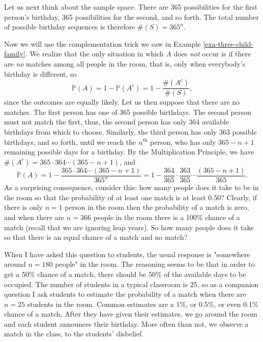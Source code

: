Let us next think about the sample space. There are 365 possibilities
for the first person's birthday, 365 possibilities for the second, and
so forth. The total number of possible birthday sequences is therefore
\(\#(S)=365^{n}\).

Now we will use the complementation trick we saw in Example \ref{exa-three-child-family}. We realize that the only situation in which \(A\) does
\emph{not} occur is if there are \emph{no} matches among all people in the room,
that is, only when everybody's birthday is different, so \[
\mathbb{P}(A)=1-\mathbb{P}(A^{c})=1-\frac{\#(A^{c})}{\#(S)}, \] since
the outcomes are equally likely. Let us then suppose that there are no
matches. The first person has one of 365 possible birthdays. The
second person must not match the first, thus, the second person has
only 364 available birthdays from which to choose. Similarly, the
third person has only 363 possible birthdays, and so forth, until we
reach the \(n^{\mathrm{th}}\) person, who has only \(365-n+1\)
remaining possible days for a birthday. By the Multiplication
Principle, we have \(\#(A^{c})=365\cdot364\cdots(365-n+1)\), and
\begin{equation}
\mathbb{P}(A)=1-\frac{365\cdot364\cdots(365-n+1)}{365^{n}}=1-\frac{364}{365}\cdot\frac{363}{365}\cdots\frac{(365-n+1)}{365}.
\end{equation}
As a surprising consequence, consider this: how many people does it
take to be in the room so that the probability of at least one match
is at least 0.50? Clearly, if there is only \(n=1\) person in the room
then the probability of a match is zero, and when there are \(n=366\)
people in the room there is a 100\% chance of a match (recall that we
are ignoring leap years). So how many people does it take so that
there is an equal chance of a match and no match?

When I have asked this question to students, the usual response is
"somewhere around \(n=180\) people" in the room. The reasoning seems
to be that in order to get a 50\% chance of a match, there should be
50\% of the available days to be occupied. The number of students in a
typical classroom is 25, so as a companion question I ask students to
estimate the probability of a match when there are \(n=25\) students
in the room. Common estimates are a 1\%, or 0.5\%, or even 0.1\% chance
of a match. After they have given their estimates, we go around the
room and each student announces their birthday. More often than not,
we observe a match in the class, to the students' disbelief.

